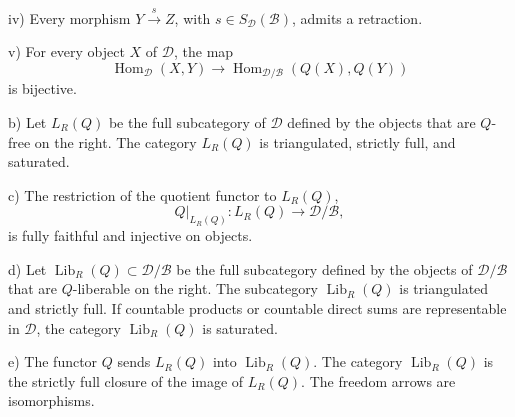 \par\noindent\hspace{1.2em}iv) Every morphism
$Y\xrightarrow{s}Z$, with $s\in S_{\mathcal D}(\mathcal B)$, admits a
retraction.

\par\noindent\hspace{1.2em}v) For every object $X$ of $\mathcal D$, the map
\[
  \operatorname{Hom}_{\mathcal D}(X,Y)\longrightarrow
  \operatorname{Hom}_{\mathcal D/\mathcal B}(Q(X),Q(Y))
\]
is bijective.

\par\noindent b) Let $L_R(Q)$ be the full subcategory of $\mathcal D$
defined by the objects that are $Q$-free on the right. The category
$L_R(Q)$ is triangulated, strictly full, and saturated.

\par\noindent c) The restriction of the quotient functor to $L_R(Q)$,
\[
  Q|_{L_R(Q)}\colon L_R(Q)\longrightarrow\mathcal D/\mathcal B,
\]
is fully faithful and injective on objects.

\par\noindent d) Let $\operatorname{Lib}_R(Q)\subset\mathcal D/\mathcal B$
be the full subcategory defined by the objects of $\mathcal D/\mathcal B$
that are $Q$-liberable on the right. The subcategory
$\operatorname{Lib}_R(Q)$ is triangulated and strictly full. If countable
products or countable direct sums are representable in $\mathcal D$, the
category $\operatorname{Lib}_R(Q)$ is saturated.

\par\noindent e) The functor $Q$ sends $L_R(Q)$ into
$\operatorname{Lib}_R(Q)$. The category $\operatorname{Lib}_R(Q)$ is the
strictly full closure of the image of $L_R(Q)$. The freedom arrows are
isomorphisms.
\endgroup
\endgroup
